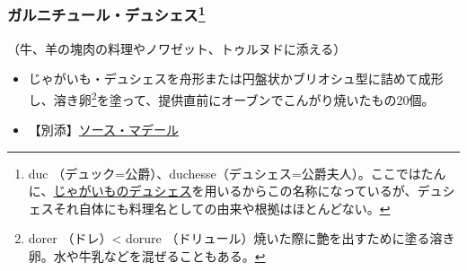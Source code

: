 \begin{recette}
\atoaki{}

\hypertarget{garniture-a-la-duchesse}{%
\subsubsection[ガルニチュール・デュシェス]{\texorpdfstring{ガルニチュール・デュシェス\footnote{duc
  （デュック=公爵）、duchesse（デュシェス=公爵夫人）。ここではたんに、\protect\hyperlink{pommes-de-terre-duchesse}{じゃがいものデュシェス}を用いるからこの名称になっているが、デュシェスそれ自体にも料理名としての由来や根拠はほとんどない。}}{ガルニチュール・デュシェス}}\label{garniture-a-la-duchesse}}



（牛、羊の塊肉の料理やノワゼット、トゥルヌドに添える）

\begin{itemize}
\item
  じゃがいも・デュシェスを舟形または円盤状かブリオシュ型に詰めて成形し、溶き卵\footnote{dorer
    （ドレ）\textless{} dorure
    （ドリュール）焼いた際に艶を出すために塗る溶き卵。水や牛乳などを混ぜることもある。}を塗って、提供直前にオーブンでこんがり焼いたもの20個。
\item
  【別添】\protect\hyperlink{sauce-madere}{ソース・マデール}
\end{itemize}

\atoaki{}

\hypertarget{garniture-a-la-favorite}{%
}
\end{recette}
